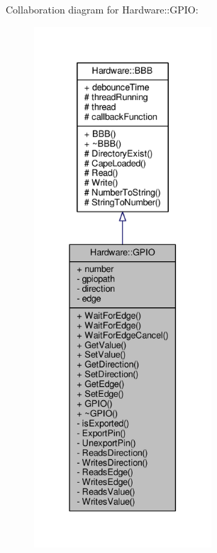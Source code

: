 Collaboration diagram for Hardware\+:\+:G\+P\+I\+O\+:
\nopagebreak
\begin{figure}[H]
\begin{center}
\leavevmode
\includegraphics[height=550pt]{class_hardware_1_1_g_p_i_o__coll__graph}
\end{center}
\end{figure}
